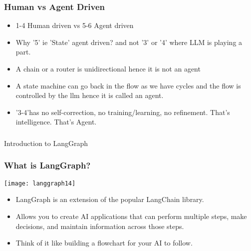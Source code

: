 \begin{frame}[fragile]\frametitle{Human vs Agent Driven}
      \begin{itemize}
        \item 1-4 Human driven vs 5-6 Agent driven
		\item Why '5' ie 'State' agent driven? and not '3' or '4' where LLM is playing a part.
		\item A chain or a router is unidirectional hence it is not an agent
		\item A state machine can  go back in the flow as we have cycles and the flow is
controlled by the llm hence it is called an agent. 
		\item '3-4'has no self-correction, no training/learning, no refinement. That's intelligence. That's Agent.
      \end{itemize}
\end{frame}

\begin{frame}[fragile]\frametitle{}
\begin{center}
{\Large Introduction to LangGraph}
\end{center}
\end{frame}

\begin{frame}[fragile]\frametitle{What is LangGraph?}

\begin{center}
\texttt{[image: langgraph14]}
\end{center}


      \begin{itemize}
        \item LangGraph is an extension of the popular LangChain library. 
		\item Allows you to create AI applications that can perform multiple steps, make decisions, and maintain information across those steps. 
		\item Think of it like building a flowchart for your AI to follow.
      \end{itemize}
 

\end{frame}

